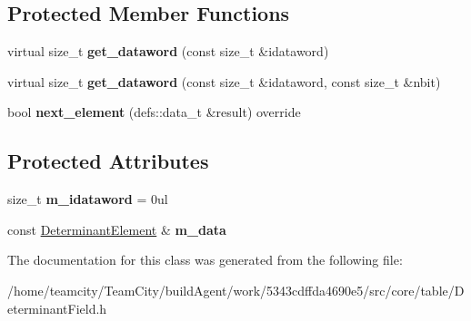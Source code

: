 \subsection*{Protected Member Functions}
\begin{DoxyCompactItemize}
\item 
virtual size\+\_\+t {\bfseries get\+\_\+dataword} (const size\+\_\+t \&idataword)\hypertarget{classDeterminantElement_1_1DatawordEnumerator_ae38acfbe1b6c240511f2c683b80abecb}{}\label{classDeterminantElement_1_1DatawordEnumerator_ae38acfbe1b6c240511f2c683b80abecb}

\item 
virtual size\+\_\+t {\bfseries get\+\_\+dataword} (const size\+\_\+t \&idataword, const size\+\_\+t \&nbit)\hypertarget{classDeterminantElement_1_1DatawordEnumerator_a12c2391ace451e06c881897c5b4079ac}{}\label{classDeterminantElement_1_1DatawordEnumerator_a12c2391ace451e06c881897c5b4079ac}

\item 
bool {\bfseries next\+\_\+element} (defs\+::data\+\_\+t \&result) override\hypertarget{classDeterminantElement_1_1DatawordEnumerator_a8d7af22fcc9e1b15a2989e48f2fb0988}{}\label{classDeterminantElement_1_1DatawordEnumerator_a8d7af22fcc9e1b15a2989e48f2fb0988}

\end{DoxyCompactItemize}
\subsection*{Protected Attributes}
\begin{DoxyCompactItemize}
\item 
size\+\_\+t {\bfseries m\+\_\+idataword} = 0ul\hypertarget{classDeterminantElement_1_1DatawordEnumerator_a1b22f498dcfa87d06d556559879e6b50}{}\label{classDeterminantElement_1_1DatawordEnumerator_a1b22f498dcfa87d06d556559879e6b50}

\item 
const \hyperlink{classDeterminantElement}{Determinant\+Element} \& {\bfseries m\+\_\+data}\hypertarget{classDeterminantElement_1_1DatawordEnumerator_ab4dcfbb2b8b76ccdb76389e39139120d}{}\label{classDeterminantElement_1_1DatawordEnumerator_ab4dcfbb2b8b76ccdb76389e39139120d}

\end{DoxyCompactItemize}


The documentation for this class was generated from the following file\+:\begin{DoxyCompactItemize}
\item 
/home/teamcity/\+Team\+City/build\+Agent/work/5343cdffda4690e5/src/core/table/Determinant\+Field.\+h\end{DoxyCompactItemize}
